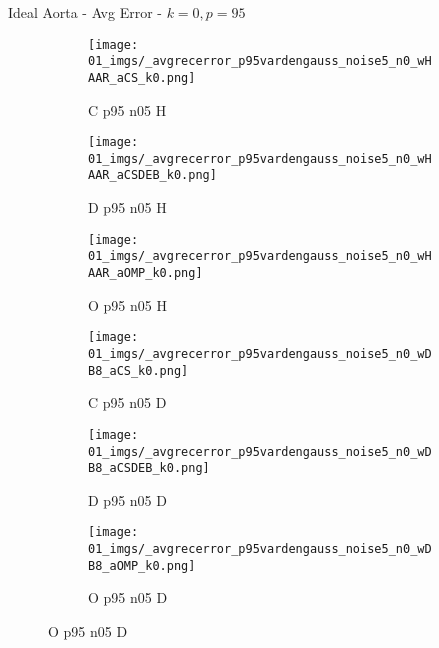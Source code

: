 \begin{frame}{Ideal Aorta - Avg Error - $k=0,p=95$}{}
\begin{figure}
\begin{subfigure}{0.13\textwidth}
\texttt{[image: 01\_imgs/\_avgrecerror\_p95vardengauss\_noise5\_n0\_wHAAR\_aCS\_k0.png]}
\caption*{\tiny C p95 n05 H}
\end{subfigure}
\begin{subfigure}{0.13\textwidth}
\texttt{[image: 01\_imgs/\_avgrecerror\_p95vardengauss\_noise5\_n0\_wHAAR\_aCSDEB\_k0.png]}
\caption*{\tiny D p95 n05 H}
\end{subfigure}
\begin{subfigure}{0.13\textwidth}
\texttt{[image: 01\_imgs/\_avgrecerror\_p95vardengauss\_noise5\_n0\_wHAAR\_aOMP\_k0.png]}
\caption*{\tiny O p95 n05 H}
\end{subfigure}
\begin{subfigure}{0.13\textwidth}
\texttt{[image: 01\_imgs/\_avgrecerror\_p95vardengauss\_noise5\_n0\_wDB8\_aCS\_k0.png]}
\caption*{\tiny C p95 n05 D}
\end{subfigure}
\begin{subfigure}{0.13\textwidth}
\texttt{[image: 01\_imgs/\_avgrecerror\_p95vardengauss\_noise5\_n0\_wDB8\_aCSDEB\_k0.png]}
\caption*{\tiny D p95 n05 D}
\end{subfigure}
\begin{subfigure}{0.13\textwidth}
\texttt{[image: 01\_imgs/\_avgrecerror\_p95vardengauss\_noise5\_n0\_wDB8\_aOMP\_k0.png]}
\caption*{\tiny O p95 n05 D}
\end{subfigure}

\vspace{5pt}


\end{figure}
\end{frame}
